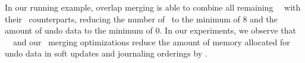 \begin{comment}
, and to limit $p \PDDepend q$ existence checks to just $p$'s
and $q$'s two oldest and newest dependencies.
%
The rules to overlap merge two bit \patches\ are similar.
\end{comment}



In our running example, overlap merging is able to combine all remaining
\rb\ \patches\ with their \nrb\ counterparts, reducing the number of \patches\
to the minimum of 8 and the amount of undo data to the minimum of 0.
%
In our experiments, we observe that \nrb\ \patches\ and our \patch\ merging
optimizations reduce the amount of memory allocated for undo data in
soft updates and journaling orderings by \patchoptundo.


\begin{comment}
%
If the only dependency between $p_1$ and $p_2$ is direct---that is, no path
$p_1 \PDepend x \PDepend p_2$ exists for any $x \not\in \{p_1,
p_2\}$---then it will always be possible to write $p_1$ and $p_2$ at the
same time.
%
Specifically, it is possible to write $p_1$ 


Many of these and similar \patches\ are mergeable and have
dependencies that allow simple (and fast) reasoning to identify many
of the mergeable pairs: two \patches\ on block $b$ that overlap no other \patches\ in \PMem[b]
and which have no dependency path from the new to the existing \patch\
will not induce a block-level cycle and so are writable together.
We know that \textit{later} changes will not cause them to induce a block-level cycle due to
invariant~\ref{cdinvar:add-before} and by not merging if the new \patch\
has a before and the before is marked as allowed to violate
invariant~\ref{cdinvar:add-before}.
%
While path existence testing is expensive, a conservative path test
of only a depth of two identifies most mergeable \patches. If the new
\patch\ has an explicit \before\ that is not the existing \patch\ and
this \before\ has a \before, then there may be a path to the existing
\patch.
%
To merge two such overlapping \patches, add the new \patch's explicit
before to the existing \patch\ (if any and if not the existing \patch).



At the end of \patch\ optimizations, say something along the lines:
%
The dynamic optimizations facilitated through \nrb\
\patches\ implement the efficiency in systems using soft updates or
journaling\todo{Actually do this for journaling} while expressing
changes modularly through structural descriptions rather than through
internal and semantic file system descriptions.

\todo{Should we talk about why we allow NRBs and merging to be
  disabled? (Debugging simplicity and depend add to \noop\ \patches\
  with \afters\ bug catching.)}
\end{comment}
